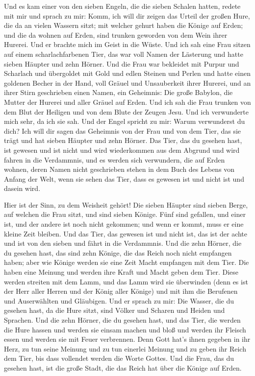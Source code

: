  Und es kam einer von den sieben Engeln, die die sieben
Schalen hatten, redete mit mir und sprach zu mir: Komm, ich will dir
zeigen das Urteil der großen Hure, die da an vielen Wassern sitzt;
 mit welcher gehurt haben die Könige auf Erden; und die da
wohnen auf Erden, sind trunken geworden von dem Wein ihrer Hurerei.
 Und er brachte mich im Geist in die Wüste. Und ich sah
eine Frau sitzen auf einem scharlachfarbenen Tier, das war voll Namen
der Lästerung und hatte sieben Häupter und zehn Hörner. 
Und die Frau war bekleidet mit Purpur und Scharlach und übergoldet mit
Gold und edlen Steinen und Perlen und hatte einen goldenen Becher in der
Hand, voll Gräuel und Unsauberkeit ihrer Hurerei,  und an
ihrer Stirn geschrieben einen Namen, ein Geheimnis: Die große Babylon,
die Mutter der Hurerei und aller Gräuel auf Erden.  Und
ich sah die Frau trunken von dem Blut der Heiligen und von dem Blute der
Zeugen Jesu. Und ich verwunderte mich sehr, da ich sie sah.
 Und der Engel spricht zu mir: Warum verwunderst du dich?
Ich will dir sagen das Geheimnis von der Frau und von dem Tier, das sie
trägt und hat sieben Häupter und zehn Hörner.  Das Tier,
das du gesehen hast, ist gewesen und ist nicht und wird wiederkommen aus
dem Abgrund und wird fahren in die Verdammnis, und es werden sich
verwundern, die auf Erden wohnen, deren Namen nicht geschrieben stehen
in dem Buch des Lebens von Anfang der Welt, wenn sie sehen das Tier,
dass es gewesen ist und nicht ist und dasein wird.

 Hier ist der Sinn, zu dem Weisheit gehört! Die sieben
Häupter sind sieben Berge, auf welchen die Frau sitzt, und sind sieben
Könige.  Fünf sind gefallen, und einer ist, und der
andere ist noch nicht gekommen; und wenn er kommt, muss er eine kleine
Zeit bleiben.  Und das Tier, das gewesen ist und nicht
ist, das ist der achte und ist von den sieben und fährt in die
Verdammnis.  Und die zehn Hörner, die du gesehen hast,
das sind zehn Könige, die das Reich noch nicht empfangen haben; aber wie
Könige werden sie eine Zeit Macht empfangen mit dem Tier.
 Die haben eine Meinung und werden ihre Kraft und Macht
geben dem Tier.  Diese werden streiten mit dem Lamm, und
das Lamm wird sie überwinden (denn es ist der Herr aller Herren und der
König aller Könige) und mit ihm die Berufenen und Auserwählten und
Gläubigen.  Und er sprach zu mir: Die Wasser, die du
gesehen hast, da die Hure sitzt, sind Völker und Scharen und Heiden und
Sprachen.  Und die zehn Hörner, die du gesehen hast, und
das Tier, die werden die Hure hassen und werden sie einsam machen und
bloß und werden ihr Fleisch essen und werden sie mit Feuer verbrennen.
 Denn Gott hat's ihnen gegeben in ihr Herz, zu tun seine
Meinung und zu tun einerlei Meinung und zu geben ihr Reich dem Tier, bis
dass vollendet werden die Worte Gottes.  Und die Frau,
das du gesehen hast, ist die große Stadt, die das Reich hat über die
Könige auf Erden.

